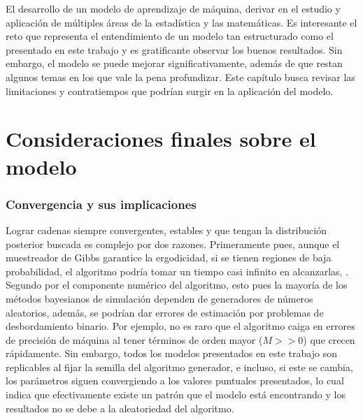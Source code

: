 \documentclass[../Main/Main.tex]{subfiles}
\begin{document}
El desarrollo de un modelo de aprendizaje de máquina, derivar en el estudio y aplicación de múltiples áreas de la estadística y las matemáticas. Es interesante el reto que representa el entendimiento de un modelo tan estructurado como el presentado en este trabajo y es gratificante observar los buenos resultados. Sin embargo, el modelo se puede mejorar significativamente, además de que restan algunos temas en los que vale la pena profundizar. Este capítulo busca revisar las limitaciones y contratiempos que podrían surgir en la aplicación del modelo.

\section{Consideraciones finales sobre el modelo}
\subsubsection*{Convergencia y sus implicaciones}
Lograr cadenas siempre convergentes, estables y que tengan la distribución posterior buscada es complejo por dos razones. Primeramente pues, aunque el muestreador de Gibbs garantice la ergodicidad, si se tienen regiones de baja probabilidad, el algoritmo podría tomar un tiempo casi infinito en alcanzarlas, \citet{robert2004monte}. Segundo por el componente numérico del algoritmo, esto pues la mayoría de los métodos bayesianos de simulación dependen de generadores de números aleatorios, además, se podrían dar errores de estimación por problemas de desbordamiento binario. Por ejemplo, no es raro que el algoritmo caiga en errores de precisión de máquina al tener términos de orden mayor ($M>>0$) que crecen rápidamente. Sin embargo, todos los modelos presentados en este trabajo son replicables al fijar la semilla del algoritmo generador, e incluso, si este se cambia, los parámetros siguen convergiendo a los valores puntuales presentados, lo cual indica que efectivamente existe un patrón que el modelo está encontrando y los resultados no se debe a la aleatoriedad del algoritmo.
\end{document}
